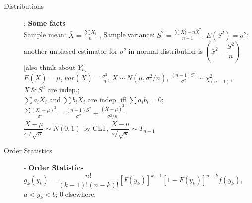 \documentclass[10pt,landscape]{article}
\begin{document}
\begin{multicols}{3}
    \begin{description}
        \item[Distributions]: \textbf{Some facts }\\
        Sample mean: $\bar{X} = \frac{\sum X_i}{n}$ ,  Sample variance: $S^2 = \frac{\sum X_i^2 - n\bar{X}^2}{n-1}$, $E(S^2) = \sigma^2$; another unbiased estimator for $\sigma^2$ in normal distribution is $(\bar{x}^2 - \dfrac{S^2}{n})$ [also think about $Y_n$]\\
        $E(\bar{X}) = \mu$, $var(\bar{X}) = \frac{\sigma^2}{n}$, $\bar{X} \sim N(\mu, \sigma^2/n)$, $\frac{(n-1)S^2}{\sigma^2} \sim	\chi_{(n-1)}^2$, $\bar{X}\ \&\ S^2$ are indep.; \\
        $\sum a_iX_i$ and $\sum b_iX_i$  are indep. iff $\sum a_ib_i = 0$;\\
        $\frac{\sum (X_i - \mu )^2}{\sigma^2} = \frac{(n-1)S^2}{\sigma^2} + \frac{(\bar{X} - \mu)^2}{\sigma^2/n}$\\
        $\dfrac{\bar{X} - \mu}{\sigma/\sqrt{n}} \sim N(0, 1)$ by CLT, $\dfrac{\bar{X} - \mu}{s/\sqrt{n}} \sim T_{n-1}$\\

         
    \end{description}
 

    
    \begin{description}
    		\item[Order Statistics] - \textbf{Order Statistics}\\ %
    		$g_k(y_k) = \dfrac{n!}{(k-1)!(n-k)!}[F(y_k)]^{k-1}[1-F(y_k)]^{n-k}f(y_k)$, $a< y_k <b$; 0 elsewhere.
		
    		
    \end{description}   
    

\end{multicols}
\end{document}
